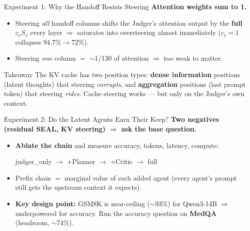 \documentclass{beamer}
\begin{document}
\begin{frame}{Experiment 1: Why the Handoff Resists Steering}
    \textbf{Attention weights sum to 1.}
    \begin{itemize}
        \item Steering \emph{all} handoff columns shifts the Judger's attention output by the \textbf{full} $c_v S_v$ every layer $\Rightarrow$ saturates into oversteering almost immediately ($c_v{=}1$ collapses 94.7\%$\rightarrow$72\%).
        \item Steering \emph{one} column $=$ $\sim$1/130 of attention $\Rightarrow$ too weak to matter.
    \end{itemize}
    \vspace{0.3cm}
    \begin{block}{Takeaway}
        The KV cache has two position types: \textbf{dense information} positions (latent thoughts) that steering \emph{corrupts}, and \textbf{aggregation} positions (last prompt token) that steering \emph{rides}. Cache steering works --- but only on the Judger's own context.
    \end{block}
\end{frame}

\begin{frame}{Experiment 2: Do the Latent Agents Earn Their Keep?}
    \textbf{Two negatives (residual SEAL, KV steering) $\Rightarrow$ ask the base question.}
    \vspace{0.2cm}
    \begin{itemize}
        \item \textbf{Ablate the chain} and measure accuracy, tokens, latency, compute:
        \begin{center}
            judger\_only $\rightarrow$ +Planner $\rightarrow$ +Critic $\rightarrow$ full
        \end{center}
        \item Prefix chain $=$ marginal value of each added agent (every agent's prompt still gets the upstream context it expects).
        \item \textbf{Key design point:} GSM8K is near-ceiling ($\sim$93\%) for Qwen3-14B $\Rightarrow$ underpowered for accuracy. Run the accuracy question on \textbf{MedQA} (headroom, $\sim$74\%).
    \end{itemize}
\end{frame}
\end{document}

